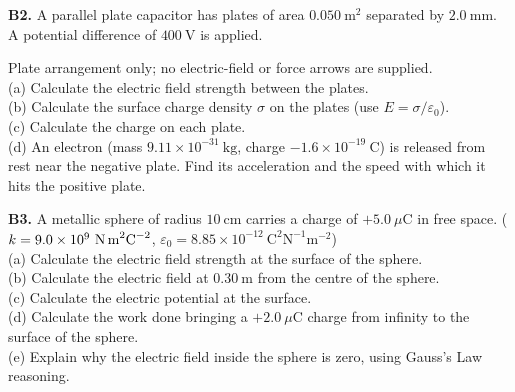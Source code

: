 \begin{exercisebox}[21]
\textbf{B2.} A parallel plate capacitor has plates
of area $0.050\ \text{m}^2$ separated by
$2.0\ \text{mm}$. A potential difference of
$400\ \text{V}$ is applied.\\[4pt]
\begin{center}
\end{center}
\small Plate arrangement only; no electric-field or force arrows are supplied.\\[4pt]
(a) Calculate the electric field strength between
the plates.\\
(b) Calculate the surface charge density $\sigma$
on the plates (use $E = \sigma/\varepsilon_0$).\\
(c) Calculate the charge on each plate.\\
(d) An electron (mass $9.11\times10^{-31}\ \text{kg}$,
charge $-1.6\times10^{-19}\ \text{C}$) is released
from rest near the negative plate. Find its
acceleration and the speed with which it hits the
positive plate.
\hfill{}

\vspace{0.4cm}

\textbf{B3.} A metallic sphere of radius $10\ \text{cm}$
carries a charge of $+5.0\ \mu\text{C}$ in free space.
($k = 9.0\times10^9\ \text{N\,m}^2\text{C}^{-2}$,
$\varepsilon_0 = 8.85\times10^{-12}\ \text{C}^2\text{N}^{-1}\text{m}^{-2}$)\\[4pt]
(a) Calculate the electric field strength at the
surface of the sphere.\\
(b) Calculate the electric field at $0.30\ \text{m}$
from the centre of the sphere.\\
(c) Calculate the electric potential at the surface.\\
(d) Calculate the work done bringing a $+2.0\ \mu\text{C}$
charge from infinity to the surface of the sphere.\\
(e) Explain why the electric field inside the sphere
is zero, using Gauss's Law reasoning.
\hfill{}


\end{exercisebox}
